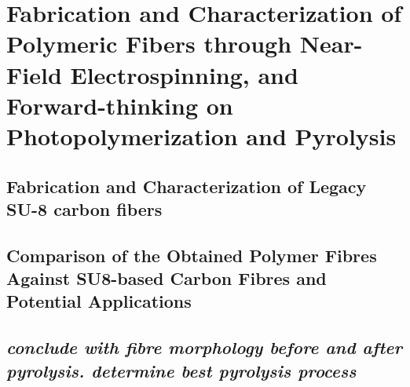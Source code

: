 
\chapter{Fabrication and Characterization of Polymeric Fibers through Near-Field Electrospinning, and Forward-thinking on Photopolymerization and Pyrolysis} %

\label{Chapter:4}

\section{}



\section{}



\section{Fabrication and Characterization of Legacy SU-8 carbon fibers}



\section{Comparison of the Obtained Polymer Fibres Against SU8-based Carbon Fibres and Potential Applications}



\section{\emph{conclude with fibre morphology before and after pyrolysis. determine best pyrolysis process}}
